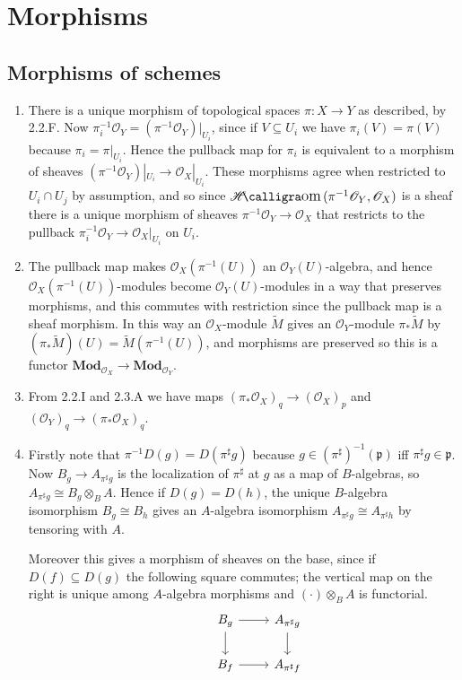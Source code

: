 \documentclass{report}
\newcommand{\cat}[1]{\mathbf{#1}} %
\newcommand{\shMod}[1]{\widetilde{#1}} %
\newcommand{\p}{\mathfrak{p}}
\renewcommand{\O}{\mathscr{O}} %
\DeclareMathOperator{\shHom}{\mathscr{H}\text{\kern -3pt {\calligra\large om}}\,}
\begin{document}
\part{Morphisms}

\chapter{Morphisms of schemes}

\begin{enumerate}[label=\textbf{6.2.\Alph*.}]
	\item There is a unique morphism of topological spaces $\pi:X\to Y$ as
	      described, by 2.2.F. Now $\pi_i^{-1}\O_Y=(\pi^{-1}\O_Y)|_{U_i}$, since
	      if $V\subseteq U_i$ we have $\pi_i(V)=\pi(V)$ because
	      $\pi_i=\pi|_{U_i}$. Hence the pullback map for $\pi_i$ is equivalent to
	      a morphism of sheaves $(\pi^{-1}\O_Y)|_{U_i}\to\O_X|_{U_i}$. These
	      morphisms agree when restricted to $U_i\cap U_j$ by assumption, and so
	      since $\shHom(\pi^{-1}\O_Y,\O_X)$ is a sheaf there is a unique morphism
	      of sheaves $\pi^{-1}\O_Y\to\O_X$ that restricts to the pullback
	      $\pi_i^{-1}\O_Y\to\O_X|_{U_i}$ on $U_i$.

	\item The pullback map makes $\O_X(\pi^{-1}(U))$ an $\O_Y(U)$-algebra, and
	      hence $\O_X(\pi^{-1}(U))$-modules become $\O_Y(U)$-modules in a way that
	      preserves morphisms, and this commutes with restriction since the
	      pullback map is a sheaf morphism. In this way an $\O_X$-module
	      $\shMod{M}$ gives an $\O_Y$-module $\pi_*\shMod M$ by
	      $(\pi_*\shMod M)(U)=\shMod M(\pi^{-1}(U))$, and morphisms are preserved
	      so this is a functor $\cat{Mod}_{\O_X}\to\cat{Mod}_{\O_Y}$.

	\item From 2.2.I and 2.3.A we have maps $(\pi_*\O_X)_q\to(\O_X)_p$ and
	      $(\O_Y)_q\to(\pi_*\O_X)_q$.

	\item Firstly note that $\pi^{-1}D(g)=D(\pi^\sharp g)$ because
	      $g\in(\pi^\sharp)^{-1}(\p)$ iff $\pi^\sharp g\in\p$. Now
	      $B_g\to A_{\pi^\sharp g}$ is the localization of $\pi^\sharp$ at $g$ as
	      a map of $B$-algebras, so $A_{\pi^\sharp g}\cong B_g\otimes_BA$. Hence
	      if $D(g)=D(h)$, the unique $B$-algebra isomorphism $B_g\cong B_h$ gives
	      an $A$-algebra isomorphism $A_{\pi^\sharp g}\cong A_{\pi^\sharp h}$ by
	      tensoring with $A$.

	      Moreover this gives a morphism of sheaves on the base, since if
	      $D(f)\subseteq D(g)$ the following square commutes; the vertical map on
	      the right is unique among $A$-algebra morphisms and $(\cdot)\otimes_BA$
	      is functorial.
	      \begin{equation*}
		      \begin{tikzcd}
			      &B_g \arrow{r} \arrow{d}
			      &A_{\pi^\sharp g} \arrow{d} \\
			      &B_f \arrow{r}
			      &A_{\pi^\sharp f}
		      \end{tikzcd}
	      \end{equation*}


\end{enumerate}
\end{document}
